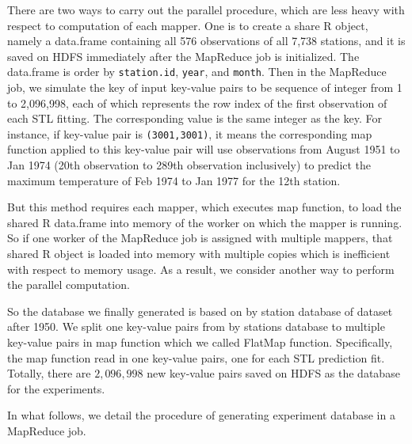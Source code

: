 There are two ways to carry out the parallel procedure, which are less 
heavy with respect to computation of each mapper. One is to create a share
R object, namely a data.frame containing all 576 observations of all 7,738 
stations, and it is saved on HDFS immediately after the MapReduce job is 
initialized. The data.frame is order by \texttt{station.id}, \texttt{year}, and
\texttt{month}. Then in the MapReduce job, we simulate the key of input key-value
pairs to be sequence of integer from 1 to 2,096,998, each of which represents the
row index of the first observation of each STL fitting. The corresponding value 
is the same integer as the key. For instance, if key-value pair is 
\texttt{(3001,3001)}, it means the corresponding map function applied to this 
key-value pair will use observations from August 1951 to Jan 1974 (20th observation
to 289th observation inclusively) to predict the maximum temperature of Feb 1974
to Jan 1977 for the 12th station.

But this method requires each mapper, which executes map function, to load the
shared R data.frame into memory of the worker on which the mapper is running. So
if one worker of the MapReduce job is assigned with multiple mappers, that shared
R object is loaded into memory with multiple copies which is inefficient with
respect to memory usage. As a result, we consider another way to perform the 
parallel computation. 

So the database we finally generated is based on 
by station database of dataset after 1950. We split one key-value pairs from by 
stations database to multiple key-value pairs in map function which we called 
FlatMap function. Specifically, the map function read in one key-value pairs, one
for each STL prediction fit. Totally, there are $2,096,998$ new key-value pairs 
saved on HDFS as the database for the experiments.

In what follows, we detail the procedure of generating experiment database in a 
MapReduce job.

